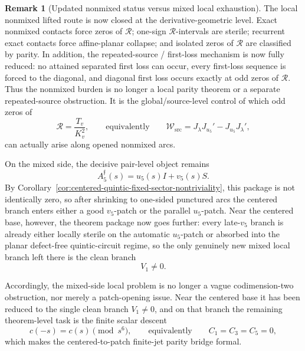 \documentclass[11pt,a4paper]{amsart}
\theoremstyle{plain}
\theoremstyle{definition}
\newtheorem{remark}[theorem]{Remark}
\begin{document}
\begin{remark}[Updated nonmixed status versus mixed local exhaustion]
\label{rem:wip-dream-parity-identity-four-point}
The local nonmixed lifted route is now closed at the derivative-geometric level.
Exact nonmixed contacts force zeros of $\mathcal R$; one-sign
$\mathcal R$-intervals are sterile; recurrent exact contacts force
affine-planar collapse; and isolated zeros of $\mathcal R$ are classified by
parity. In addition, the repeated-source / first-loss mechanism is now fully
reduced: no attained separated first loss can occur, every first-loss sequence
is forced to the diagonal, and diagonal first loss occurs exactly at odd zeros
of $\mathcal R$. Thus the nonmixed burden is no longer a local parity theorem
or a separate repeated-source obstruction. It is the global/source-level
control of which odd zeros of
\[
\mathcal R=\frac{T_v}{K_v^2},
\qquad\text{equivalently}\qquad
\mathcal W_{\mathrm{src}}=J_\lambda J_{u_5}'-J_{u_5}J_\lambda',
\]
can actually arise along opened nonmixed arcs.

On the mixed side, the decisive pair-level object remains
\[
A_5^{\mathfrak f}(s)=u_5(s)I+v_5(s)S.
\]
By Corollary~\ref{cor:centered-quintic-fixed-sector-nontriviality}, this
package is not identically zero, so after shrinking to one-sided punctured arcs
the centered branch enters either a good $v_5$-patch or the parallel
$u_5$-patch. Near the centered base, however, the theorem package now goes
further: every late-$v_5$ branch is already either locally sterile on the
automatic $u_5$-patch or absorbed into the planar defect-free quintic-circuit
regime, so the only genuinely new mixed local branch left there is the clean
branch
\[
V_1\neq 0.
\]

Accordingly, the mixed-side local problem is no longer a vague codimension-two
obstruction, nor merely a patch-opening issue. Near the centered base it has
been reduced to the single clean branch $V_1\neq 0$, and on that branch the
remaining theorem-level task is the finite scalar descent
\[
c(-s)=c(s)\pmod{s^6},
\qquad\text{equivalently}\qquad
C_1=C_3=C_5=0,
\]
which makes the centered-to-patch finite-jet parity bridge formal.
\end{remark}
\end{document}
